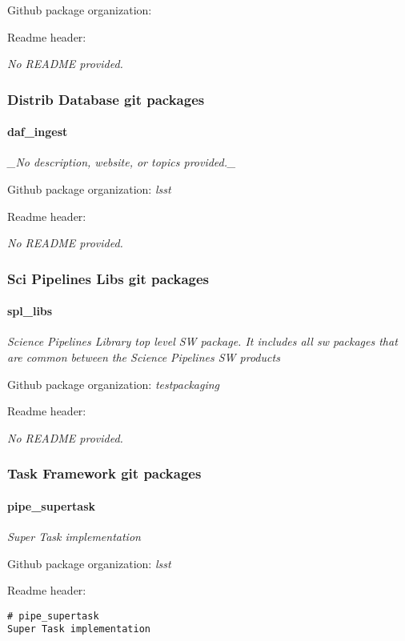 Github package organization: \textit{}

Readme header:

\textit{No README provided.}

\subsubsection{Distrib Database git packages}
\paragraph{daf\_ingest}
\textit{\_No description, website, or topics provided.\_}

Github package organization: \textit{lsst}

Readme header:

\textit{No README provided.}

\subsubsection{Sci Pipelines Libs git packages}
\paragraph{spl\_libs}
\textit{Science Pipelines Library top level SW package. It includes all sw
packages that are common between the Science Pipelines SW products}

Github package organization: \textit{testpackaging}

Readme header:

\textit{No README provided.}

\subsubsection{Task Framework git packages}
\paragraph{pipe\_supertask}
\textit{Super Task implementation}

Github package organization: \textit{lsst}

Readme header:

\begin{verbatim}
# pipe_supertask
Super Task implementation\end{verbatim}


